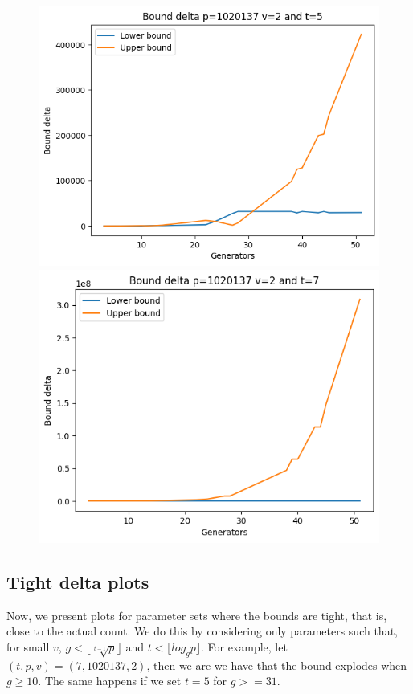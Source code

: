 \documentclass{article}
\begin{document}
\begin{figure}[H]
\begin{minipage}{.49\textwidth}
            \includegraphics[width=\textwidth]{../plots/tuples_figures/delta_1020137v2_large/Bound delta p=1020137 v=2 and t=5.png}
            \includegraphics[width=\textwidth]{../plots/tuples_figures/delta_1020137v2_large/Bound delta p=1020137 v=2 and t=7.png}
    \end{minipage}
\end{figure}

\subsection{Tight delta plots}

Now, we present plots for parameter sets where the bounds are tight, that is, close to the actual count. We do this by considering only parameters such that, for small $v$, $g < \lfloor \sqrt[t-1]{p} \rfloor$ and $t < \lfloor log_g p \rfloor $. For example, let $(t, p, v) = (7, 1020137, 2)$, then we are we have that the bound explodes when $g \geq 10$. The same happens if we set $t = 5$ for $g >= 31$.
\end{document}
